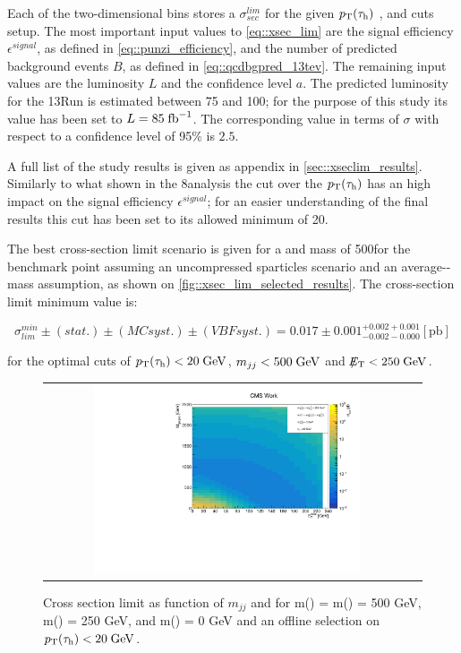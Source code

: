 Each of the two-dimensional bins stores a $\sigma^{lim}_{sec}$ for the given $p_{\text{T}}(\tau_{\text{h}})$ , \mjj and \met cuts setup. The most important input values to \autoref{eq::xsec_lim} are the signal efficiency $\epsilon^{signal}$, as defined in \autoref{eq::punzi_efficiency},  and the number of predicted background events $B$, as defined in \autoref{eq::qcdbgpred_13tev}. The remaining input values are the luminosity $L$ and the confidence level $a$. The predicted luminosity for the 13\tev Run \cite{Bruning:2002yh} is estimated between 75 and 100\invfb; for the purpose of this study its value has been set to $L = 85\;\text{fb}^{-1}$. The corresponding value in terms of $\sigma$ with respect to a confidence level of 95\%  is $2.5$.

A full list of the study results is given as appendix in \autoref{sec::xseclim_results}. Similarly to what shown in the 8\tev analysis the cut over the $p_{\text{T}}(\tau_{\text{h}})$ has an high impact on the signal efficiency $\epsilon^{signal}$; for an easier understanding of the final results this cut has been set to its allowed minimum of 20\gev.

The best cross-section limit scenario is given for a \charginopm and \neutralinotwo mass of 500\gev for the benchmark point assuming an uncompressed sparticles scenario and an average-\stau-mass assumption, as shown on \autoref{fig::xsec_lim_selected_results}. The cross-section limit minimum value is:

\begin{equation}
\sigma_{lim}^{min}\pm(stat.)\pm(MC syst.)\pm(VBF syst.) = 0.017\pm0.001^{+0.002 + 0.001}_{-0.002-0.000} [\text{pb}]
\label{eq::xsec_lim_best_result}
\end{equation}

for the optimal cuts of  $p_{\text{T}}(\tau_{\text{h}}) <  20\;\text{Ge}\kern-0.06667em\text{V}$,  $ m_{jj}< 500\;\text{Ge}\kern-0.06667em\text{V} $ and $\slash\mkern-12mu{E}_{\text{T}} < 250\;\text{Ge}\kern-0.06667em\text{V}$.

\begin{figure}[tbh!]
	\centering
	\begin{tabular}{cc}
		\includegraphics[width=0.75\textwidth]{analysis/pics/JetInvMass_vs_MET_xseclim_Chargino500_Stau250_LSP000_taupt20.pdf}
	\end{tabular}
	\caption{Cross section limit as function of $m_{jj}$ and \met for m(\charginopm) = m(\neutralinotwo) = 500 GeV,  m(\stau) = 250 GeV, and m(\neutralinoone) = 0 GeV and an offline selection on $p_{\text{T}}(\tau_{\text{h}}) <  20\;\text{Ge}\kern-0.06667em\text{V}$.}
	\label{fig::xsec_lim_selected_results}
\end{figure}

